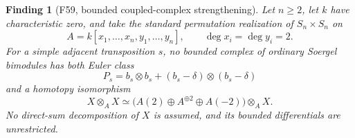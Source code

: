 \documentclass[11pt,a4paper]{article}
\newcommand{\fid}[1]{\textsf{#1}}\newcommand{\gate}[1]{\textsf{#1}}
\theoremstyle{named}\newtheorem{finding}{Finding}[section]
\theoremstyle{definition}\newtheorem{definition}[finding]{Definition}
\theoremstyle{remark}\newtheorem{remark}[finding]{Remark}
\begin{document}
\begin{finding}[\fid{F59}, bounded coupled-complex strengthening]
\label{f:boundedSoergelNoGo}
Let \(n\ge2\), let \(k\) have characteristic zero, and take the
standard permutation realization of \(S_n\times S_n\) on
\[
 A=k[x_1,\ldots,x_n,y_1,\ldots,y_n],
 \qquad \deg x_i=\deg y_i=2.
\]
For a simple adjacent transposition \(s\), no bounded complex of
ordinary Soergel bimodules has both Euler class
\[
 P_s=b_s\otimes b_s+(b_s-\delta)\otimes(b_s-\delta)
\]
and a homotopy isomorphism
\begin{equation}\label{eq:boundedSoergelquadratic}
 X\otimes_A X\simeq
 \bigl(A(2)\oplus A^{\oplus2}\oplus A(-2)\bigr)\otimes_A X.
\end{equation}
No direct-sum decomposition of \(X\) is assumed, and its bounded
differentials are unrestricted.
\end{finding}
\end{document}
